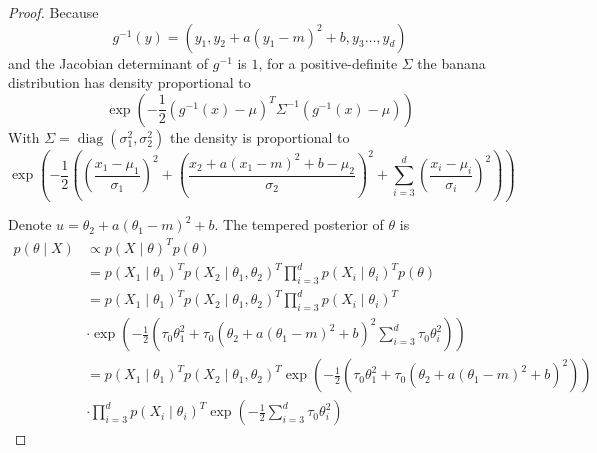 \documentclass[english,twoside,openright]{HYgraduMLDS}
\DeclareMathOperator{\diag}{diag}
\begin{document}
\begin{proof}
    Because
    \[
    g^{-1}(y) = (y_1, y_2 + a(y_1 - m)^2 + b, y_3\dotsc, y_d)
    \]
    and the Jacobian determinant of \(g^{-1}\) is \(1\),
    for a positive-definite \(\Sigma\) the banana distribution has
    density proportional to
    \[
    \exp\left(-\frac{1}{2}(g^{-1}(x) - \mu)^T\Sigma^{-1}(g^{-1}(x) - \mu)\right)
    \]
    With \(\Sigma = \diag(\sigma_1^2, \sigma_2^2)\) the density is proportional 
    to
    \[
    \exp
    \left(-\frac{1}{2}\left(\left(\frac{x_1 - \mu_1}{\sigma_1}\right)^2
    + \left(\frac{x_2 + a(x_1 - m)^2 + b - \mu_2}{\sigma_2}\right)^2
    + \sum_{i=3}^d\left(\frac{x_i - \mu_i}{\sigma_i}\right)^2\right)\right)
    \]

    Denote \(u = \theta_2 + a(\theta_1 - m)^2 + b\).
    The tempered posterior of \(\theta\) is
    \begin{align*}
        p(\theta\mid X) &\propto p(X\mid \theta)^Tp(\theta)
        \\&= p(X_1\mid \theta_1)^Tp(X_2\mid \theta_1, \theta_2)^T
        \prod_{i=3}^d p(X_i\mid \theta_i)^T p(\theta)
        \\&= p(X_1\mid \theta_1)^Tp(X_2\mid \theta_1, \theta_2)^T
        \prod_{i=3}^d p(X_i\mid \theta_i)^T
        \\&\cdot \exp\left(-\frac{1}{2}\left(\tau_0\theta_1^2
        + \tau_0(\theta_2 + a(\theta_1 - m)^2 + b)^2
        \sum_{i=3}^d \tau_0\theta_i^2\right)\right)
        \\&= p(X_1\mid \theta_1)^Tp(X_2\mid \theta_1, \theta_2)^T
        \exp\left(-\frac{1}{2}\left(\tau_0\theta_1^2
        + \tau_0(\theta_2 + a(\theta_1 - m)^2 + b)^2\right)\right)
        \\&\cdot \prod_{i=3}^d p(X_i\mid \theta_i)^T
        \exp\left(-\frac{1}{2}\sum_{i=3}^d \tau_0\theta_i^2\right)
    \end{align*}


\end{proof}
\end{document}
